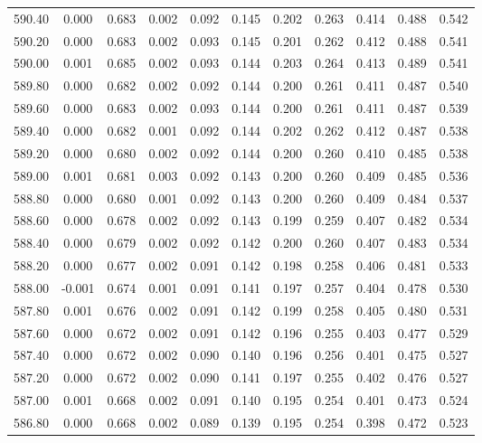 \begin{longtable}{cccccccccc}
    590.40 &  0.000 &  0.683 &  0.002 &  0.092 &  0.145 &  0.202 &  0.263 &  0.414 &  0.488 &  0.542 \\
    590.20 &  0.000 &  0.683 &  0.002 &  0.093 &  0.145 &  0.201 &  0.262 &  0.412 &  0.488 &  0.541 \\
    590.00 &  0.001 &  0.685 &  0.002 &  0.093 &  0.144 &  0.203 &  0.264 &  0.413 &  0.489 &  0.541 \\
    589.80 &  0.000 &  0.682 &  0.002 &  0.092 &  0.144 &  0.200 &  0.261 &  0.411 &  0.487 &  0.540 \\
    589.60 &  0.000 &  0.683 &  0.002 &  0.093 &  0.144 &  0.200 &  0.261 &  0.411 &  0.487 &  0.539 \\
    589.40 &  0.000 &  0.682 &  0.001 &  0.092 &  0.144 &  0.202 &  0.262 &  0.412 &  0.487 &  0.538 \\
    589.20 &  0.000 &  0.680 &  0.002 &  0.092 &  0.144 &  0.200 &  0.260 &  0.410 &  0.485 &  0.538 \\
    589.00 &  0.001 &  0.681 &  0.003 &  0.092 &  0.143 &  0.200 &  0.260 &  0.409 &  0.485 &  0.536 \\
    588.80 &  0.000 &  0.680 &  0.001 &  0.092 &  0.143 &  0.200 &  0.260 &  0.409 &  0.484 &  0.537 \\
    588.60 &  0.000 &  0.678 &  0.002 &  0.092 &  0.143 &  0.199 &  0.259 &  0.407 &  0.482 &  0.534 \\
    588.40 &  0.000 &  0.679 &  0.002 &  0.092 &  0.142 &  0.200 &  0.260 &  0.407 &  0.483 &  0.534 \\
    588.20 &  0.000 &  0.677 &  0.002 &  0.091 &  0.142 &  0.198 &  0.258 &  0.406 &  0.481 &  0.533 \\
    588.00 & -0.001 &  0.674 &  0.001 &  0.091 &  0.141 &  0.197 &  0.257 &  0.404 &  0.478 &  0.530 \\
    587.80 &  0.001 &  0.676 &  0.002 &  0.091 &  0.142 &  0.199 &  0.258 &  0.405 &  0.480 &  0.531 \\
    587.60 &  0.000 &  0.672 &  0.002 &  0.091 &  0.142 &  0.196 &  0.255 &  0.403 &  0.477 &  0.529 \\
    587.40 &  0.000 &  0.672 &  0.002 &  0.090 &  0.140 &  0.196 &  0.256 &  0.401 &  0.475 &  0.527 \\
    587.20 &  0.000 &  0.672 &  0.002 &  0.090 &  0.141 &  0.197 &  0.255 &  0.402 &  0.476 &  0.527 \\
    587.00 &  0.001 &  0.668 &  0.002 &  0.091 &  0.140 &  0.195 &  0.254 &  0.401 &  0.473 &  0.524 \\
    586.80 &  0.000 &  0.668 &  0.002 &  0.089 &  0.139 &  0.195 &  0.254 &  0.398 &  0.472 &  0.523 \\

\end{longtable}
